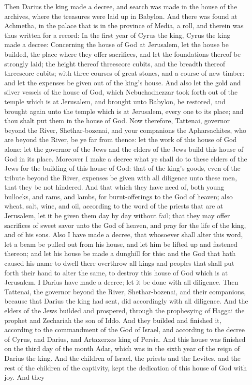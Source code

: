 Then Darius the king made a decree, and search was made in the house of the archives, where the treasures were laid up in Babylon. And there was found at Achmetha, in the palace that is in the province of Media, a roll, and therein was thus written for a record: In the first year of Cyrus the king, Cyrus the king made a decree: Concerning the house of God at Jerusalem, let the house be builded, the place where they offer sacrifices, and let the foundations thereof be strongly laid; the height thereof threescore cubits, and the breadth thereof threescore cubits; with three courses of great stones, and a course of new timber: and let the expenses be given out of the king’s house. And also let the gold and silver vessels of the house of God, which Nebuchadnezzar took forth out of the temple which is at Jerusalem, and brought unto Babylon, be restored, and brought again unto the temple which is at Jerusalem, every one to its place; and thou shalt put them in the house of God.  Now therefore, Tattenai, governor beyond the River, Shethar-bozenai, and your companions the Apharsachites, who are beyond the River, be ye far from thence: let the work of this house of God alone; let the governor of the Jews and the elders of the Jews build this house of God in its place. Moreover I make a decree what ye shall do to these elders of the Jews for the building of this house of God: that of the king’s goods, even of the tribute beyond the River, expenses be given with all diligence unto these men, that they be not hindered. And that which they have need of, both young bullocks, and rams, and lambs, for burnt-offerings to the God of heaven; also wheat, salt, wine, and oil, according to the word of the priests that are at Jerusalem, let it be given them day by day without fail; that they may offer sacrifices of sweet savor unto the God of heaven, and pray for the life of the king, and of his sons. Also I have made a decree, that whosoever shall alter this word, let a beam be pulled out from his house, and let him be lifted up and fastened thereon; and let his house be made a dunghill for this: and the God that hath caused his name to dwell there overthrow all kings and peoples that shall put forth their hand to alter the same, to destroy this house of God which is at Jerusalem. I Darius have made a decree; let it be done with all diligence.  Then Tattenai, the governor beyond the River, Shethar-bozenai, and their companions, because that Darius the king had sent, did accordingly with all diligence. And the elders of the Jews builded and prospered, through the prophesying of Haggai the prophet and Zechariah the son of Iddo. And they builded and finished it, according to the commandment of the God of Israel, and according to the decree of Cyrus, and Darius, and Artaxerxes king of Persia. And this house was finished on the third day of the month Adar, which was in the sixth year of the reign of Darius the king.  And the children of Israel, the priests and the Levites, and the rest of the children of the captivity, kept the dedication of this house of God with joy. And they 